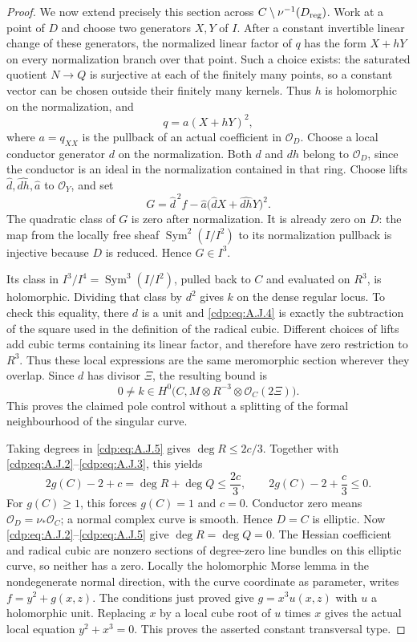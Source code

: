 \begin{proof}
We now extend precisely this section across $C\setminus
\nu^{-1}(D_{\rm reg})$. Work at a point of $D$ and choose
two generators $X,Y$ of $I$. After a constant invertible linear
change of these generators, the normalized linear factor of
$q$ has the form $X+hY$ on every normalization branch over
that point. Such a choice exists: the saturated quotient
$N\to Q$ is surjective at each of the finitely many points,
so a constant vector can be chosen outside their finitely
many kernels. Thus $h$ is holomorphic on the normalization,
and
\[
 q=a(X+hY)^2,
\]
where $a=q_{XX}$ is the pullback of an actual coefficient
in $\mathcal O_D$. Choose a local conductor generator $d$
on the normalization. Both $d$ and $dh$ belong to
$\mathcal O_D$, since the conductor is an ideal in the
normalization contained in that ring. Choose lifts
$\widehat d,\widehat{dh},\widehat a$ to $\mathcal O_Y$,
and set
\[
 G=\widehat d^{\,2} f-
    \widehat a\bigl(\widehat d X+\widehat{dh}Y\bigr)^2.
                                                        \tag{A.J.4}\label{cdp:eq:A.J.4}
\]
The quadratic class of $G$ is zero after normalization.
It is already zero on $D$: the map from the locally free
sheaf $\operatorname{Sym}^2(I/I^2)$ to its normalization
pullback is injective because $D$ is reduced. Hence
$G\in I^3$.

Its class in $I^3/I^4=\operatorname{Sym}^3(I/I^2)$,
pulled back to $C$ and evaluated on $R^3$, is holomorphic.
Dividing that class by $d^2$ gives $k$ on the dense regular
locus. To check this equality, there $d$ is a unit and
\eqref{cdp:eq:A.J.4} is exactly the subtraction of the square used in the
definition of the radical cubic. Different choices of lifts
add cubic terms containing its linear factor, and therefore
have zero restriction to $R^3$. Thus these local expressions
are the same meromorphic section wherever they overlap.
Since $d$ has divisor $\Xi$, the resulting bound is
\[
 0\ne k\in H^0\bigl(C,M\otimes R^{-3}
                               \otimes\mathcal O_C(2\Xi)\bigr).
                                                        \tag{A.J.5}\label{cdp:eq:A.J.5}
\]
This proves the claimed pole control without a splitting of
the formal neighbourhood of the singular curve.

Taking degrees in \eqref{cdp:eq:A.J.5} gives $\deg R\leq2c/3$.
Together with \eqref{cdp:eq:A.J.2}--\eqref{cdp:eq:A.J.3}, this yields
\[
 2g(C)-2+c=\deg R+\deg Q\leq\frac{2c}{3},
 \qquad 2g(C)-2+\frac c3\leq0.                     \tag{A.J.6}\label{cdp:eq:A.J.6}
\]
For $g(C)\geq1$, this forces $g(C)=1$ and $c=0$.
Conductor zero means $\mathcal O_D=\nu_*\mathcal O_C$;
a normal complex curve is smooth. Hence $D=C$ is elliptic.
Now \eqref{cdp:eq:A.J.2}--\eqref{cdp:eq:A.J.5} give $\deg R=\deg Q=0$.
The Hessian coefficient and radical cubic are nonzero
sections of degree-zero line bundles on this elliptic curve,
so neither has a zero. Locally the holomorphic Morse lemma
in the nondegenerate normal direction, with the curve
coordinate as parameter, writes $f=y^2+g(x,z)$.
The conditions just proved give $g=x^3u(x,z)$ with $u$ a
holomorphic unit. Replacing $x$ by a local cube root of $u$
times $x$ gives the actual local equation $y^2+x^3=0$.
This proves the asserted constant transversal type.


\end{proof}
